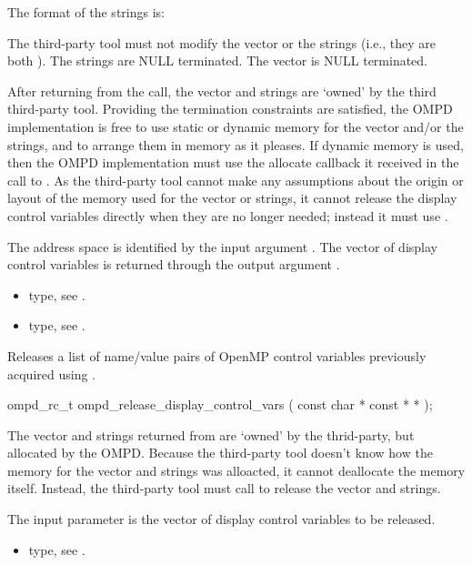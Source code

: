 The format of the strings is:
\begin{center}
\end{center}

The third-party tool must not modify the vector or the strings
(i.e., they are both ).
The strings are NULL terminated.
The vector is NULL terminated.

After returning from the call, the vector and strings are `owned'
by the third third-party tool.
Providing the termination constraints are satisfied, the OMPD
implementation is free to use static or dynamic memory for the
vector and/or the strings, and to arrange them in memory
as it pleases.
If dynamic memory is used, then the OMPD implementation must use
the allocate callback it received in the call to .
As the third-party tool cannot make any assumptions about the origin or
layout of the memory used for the vector or strings, it cannot release
the display control variables directly when they are no longer
needed; instead it must use .

\argdesc
The address space is identified by the input argument .
The vector of display control variables is returned through
the output argument .

\crossreferences
\begin{itemize}
	\item {} type, see .
	\item {} type, see .
\end{itemize}


\label{ompd:ompd_release_display_control_vars}
\label{sec:ompd_release_display_control_vars}
\summary

Releases a list of name/value pairs of OpenMP control variables
previously acquired using .
\format
\cspecificstart
\begin{boxedcode}
ompd\_rc\_t ompd\_release\_display\_control\_vars (
  const char * const *        *
);
\end{boxedcode}
\cspecificend

\descr
The vector and strings returned from 
are `owned' by the thrid-party, but allocated by the OMPD.
Because the third-party tool doesn't know how the memory for the vector
and strings was alloacted, it cannot deallocate the memory itself.
Instead, the third-party tool must call
 to release the vector
and strings.

\argdesc
The input parameter  is the vector of display control variables to be released.

\crossreferences
\begin{itemize}
	\item {} type, see .
\end{itemize}
